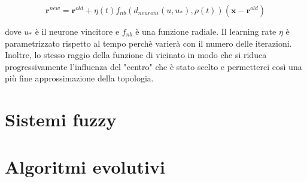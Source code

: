 \documentclass[10pt,a4paper]{article}
\begin{document}
$$
\mathbf{r}^{new} = \mathbf{r}^{old} + \eta(t)f_{nb}(d_{neuroni}(u,u_*),\rho(t))(\mathbf{x} - \mathbf{r}^{old})
$$

dove $u_*$ è il neurone vincitore e $f_{nb}$ è una funzione radiale. Il learning rate $\eta$ è parametrizzato rispetto al tempo perchè varierà con il numero delle iterazioni. Inoltre, lo stesso raggio della funzione di vicinato in modo che si riduca progressivamente l'influenza del "centro" che è stato scelto e permetterci così una più fine approssimazione della topologia.

\section{Sistemi fuzzy}


\section{Algoritmi evolutivi}
\end{document}
